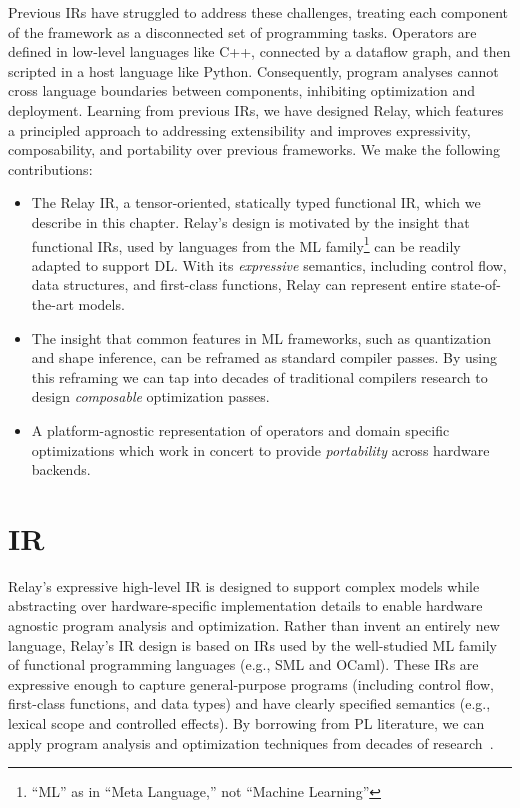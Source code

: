   Previous IRs have struggled to address these challenges, treating each
    component of the framework as a disconnected set of programming tasks.
  Operators are defined in low-level languages like C++,
    connected by a dataflow graph, and then scripted
    in a host language like Python.
  Consequently,
    program analyses cannot cross language boundaries between components,
    inhibiting optimization and deployment.
  Learning from previous IRs, we have designed Relay,
    which features a principled approach to addressing extensibility
    and improves expressivity, composability, and portability
    over previous frameworks.
  We make the following contributions:
  \begin{itemize}
    \item The Relay IR, a tensor-oriented, statically typed
      functional IR,
      which we describe in this chapter.
    Relay's design is motivated by the insight that functional IRs, used by
    languages from the ML family\footnote{``ML'' as in ``Meta Language,'' not
    ``Machine Learning''} can be readily adapted to support DL.
    With its \textit{expressive} semantics,
      including control flow, data structures, and first-class functions,
      Relay can represent entire state-of-the-art models.
    \item The insight that common features in ML frameworks,
      such as quantization and shape inference,
      can be reframed as standard compiler passes.
    By using this reframing we can tap into
      decades of traditional compilers research to design
      \textit{composable} optimization passes.
    \item
      A platform-agnostic representation of operators and domain specific
        optimizations which work in concert to provide \textit{portability}
        across hardware backends.
  \end{itemize}


\section{IR}

Relay's expressive high-level IR is designed to support
  complex models while abstracting over hardware-specific
  implementation details to enable hardware agnostic program
  analysis and optimization.
Rather than invent an entirely new language,
  Relay's IR design is based on IRs used by the well-studied ML family of
  functional programming languages (e.g., SML and OCaml).
These IRs are expressive enough to capture general-purpose programs
  (including control flow, first-class functions, and data types)
  and have clearly specified semantics (e.g., lexical scope and controlled effects).
By borrowing from PL literature,
  we can apply program analysis and optimization techniques from decades of research~\citep{haskell_vector}.

